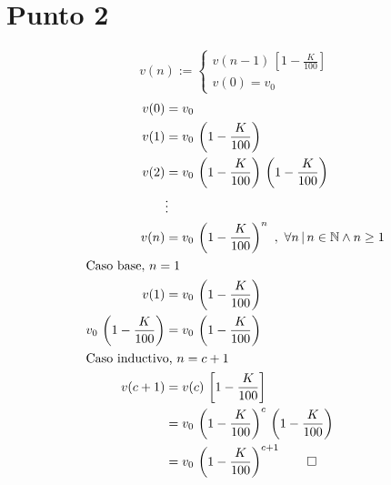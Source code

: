 \documentclass{article}
\begin{document}
\section{Punto 2}
\begin{equation*}
    v(n) :=
    \begin{cases}
        v(n-1)\,\left[1-\frac{K}{100}\right]\\
        v(0) = v_0
    \end{cases}
\end{equation*}
\begin{alignat*}{2}
    v(0) &= v_0\\
    v(1) &= v_0\,\left(1-\frac{K}{100}\right)\\
    v(2) &= v_0\,\left(1-\frac{K}{100}\right)\,\left(1-\frac{K}{100}\right)\\
    &\vdots\\
    v(n) &= v_0\,\left(1-\frac{K}{100}\right)^n \ ,\ \forall n\,\vert\, n \in \mathbb{N} \wedge n \geq 1\\
    \intertext{Caso base, $n=1$}
    v(1) &= v_0 \,\left(1-\frac{K}{100}\right)\\
    v_0\,\left(1-\frac{K}{100}\right) &= v_0 \,\left(1-\frac{K}{100}\right)\\
    \intertext{Caso inductivo, $n = c+1$}
    v(c+1) &= v(c)\,\left[1 - \frac{K}{100}\right]\\
    &= v_0\,\left(1-\frac{K}{100}\right)^c\,\left(1-\frac{K}{100}\right)\\
    &= v_0\,\left(1-\frac{K}{100}\right)^{c+1} \tag*{$\Box$}\\
\end{alignat*}
\end{document}
